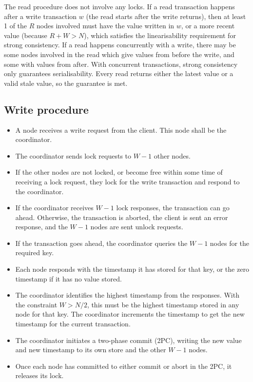 \documentclass[12pt,a4paper,twoside,openany]{report}
\begin{document}
The read procedure does not involve any locks. If a read transaction happens after a write transaction $w$ (the read starts after the write returns), then at least 1 of the $R$ nodes involved must have the value written in $w$, or a more recent value (because $R + W > N$), which satisfies the linearisability requirement for strong consistency. If a read happens concurrently with a write, there may be some nodes involved in the read which give values from before the write, and some with values from after. With concurrent transactions, strong consistency only guarantees serialisability. Every read returns either the latest value or a valid stale value, so the guarantee is met.

\subsection{Write procedure}

\begin{itemize}
\item
A node receives a write request from the client. This node shall be the coordinator.

\item
The coordinator sends lock requests to $W - 1$ other nodes.

\item
If the other nodes are not locked, or become free within some time of receiving a lock request, they lock for the write transaction and respond to the coordinator.

\item
If the coordinator receives $W - 1$ lock responses, the transaction can go ahead. Otherwise, the transaction is aborted, the client is sent an error response, and the $W - 1$ nodes are sent unlock requests.

\item
If the transaction goes ahead, the coordinator queries the $W - 1$ nodes for the required key.

\item
Each node responds with the timestamp it has stored for that key, or the zero timestamp if it has no value stored.

\item
The coordinator identifies the highest timestamp from the responses. With the constraint $W > N/2$, this must be the highest timestamp stored in any node for that key. The coordinator increments the timestamp to get the new timestamp for the current transaction.

\item
The coordinator initiates a two-phase commit (2PC), writing the new value and new timestamp to its own store and the other $W - 1$ nodes.

\item
Once each node has committed to either commit or abort in the 2PC, it releases its lock.

\end{itemize}
\end{document}
